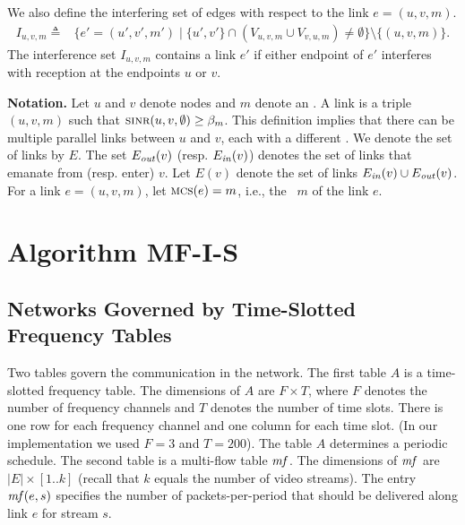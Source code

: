 \documentclass[11pt]{article}
\newtheorem{claim}[theorem]{Claim}
\newenvironment{proof sketch}[1]{\noindent {\emph{Proof sketch of #1:}}}{\hfill \qed}
\newcommand{\eqdf}{\triangleq}
\newcommand{\SINR}{\text{\sc{sinr}}}
\newcommand{\mf}{\text{\emph{mf}}}
\newcommand{\MCS}{\text{\sc{mcs}}}
\newcommand{\Ein}{E_{\text{\emph{in}}}}
\newcommand{\Eout}{E_{\text{\emph{out}}}}
\newcommand{\algA}{\textsc{MF-I-S}}
\begin{document}
We also define the interfering set of edges with respect to the link
$e=(u,v,m)$.
\begin{align*}
  I_{u,v,m} \eqdf &\{ e'=(u',v',m') \mid \{u',v'\} \cap (V_{u,v,m}
  \cup V_{v,u,m}) \neq \emptyset\} \setminus \{(u,v,m)\}.
\end{align*}
The interference set $I_{u,v,m}$ contains a link $e'$ if either
endpoint of $e'$ interferes with reception at the endpoints $u$ or
$v$.

\medskip
\noindent
\textbf{Notation.}  Let $u$ and $v$ denote nodes and $m$ denote an
\MCS.  A link is a triple $(u,v,m)$ such that
$\SINR(u,v,\emptyset)\geq \beta_m$.  This definition implies that
there can be multiple parallel links between $u$ and $v$, each with a
different \MCS.
%
We denote the set of links by $E$. The set $\Eout(v)$ (resp.
$\Ein(v)$) denotes the set of links that emanate from (resp. enter)
$v$. Let $E(v)$ denote the set of links $\Ein(v)\cup \Eout(v)$.
%
For a link $e=(u,v,m)$, let $\MCS(e)=m$, i.e., the \MCS\ $m$ of the
link $e$.



\section{Algorithm \algA}\label{sec:outline}
\subsection{Networks Governed by Time-Slotted Frequency
  Tables}\label{sec:govern}
Two tables govern the communication in the network.  The first table
$A$ is a time-slotted frequency table. The dimensions of $A$ are
$F\times T$, where $F$ denotes the number of frequency channels and
$T$ denotes the number of time slots.  There is one row for each
frequency channel and one column for each time slot. (In our
implementation we used $F=3$ and $T=200$).  The table $A$ determines a
periodic schedule.  The second table is a multi-flow table $\mf$. The
dimensions of $\mf$ are $|E|\times [1..k]$ (recall that $k$ equals the
number of video streams).  The entry $\mf(e,s)$ specifies the number
of packets-per-period that should be delivered along link $e$ for
stream $s$.
\end{document}
